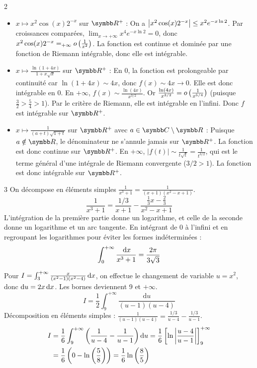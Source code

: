 \begin{correction}{2}
\begin{itemize}
    \item $x \mapsto x^2 \cos(x) 2^{-x}$ sur $\R^{+}$ :
    On a $\left|x^2 \cos(x) 2^{-x}\right| \le x^2 e^{-x \ln 2}$. Par croissances comparées, $\lim_{x\to +\infty} x^4 e^{-x \ln 2} = 0$, donc $x^2 \cos(x) 2^{-x} =_{+\infty} o\left(\frac{1}{x^2}\right)$. La fonction est continue et dominée par une fonction de Riemann intégrable, donc elle est intégrable.
    
    \item $x \mapsto \frac{\ln(1+4x)}{1+x\sqrt{x}}$ sur $\R^{+}$ :
    En $0$, la fonction est prolongeable par continuité car $\ln(1+4x) \sim 4x$, donc $f(x) \sim 4x \to 0$. Elle est donc intégrable en 0.
    En $+\infty$, $f(x) \sim \frac{\ln(4x)}{x^{3/2}}$. Or $\frac{\ln(4x)}{x^{3/2}} = o\left(\frac{1}{x^{5/4}}\right)$ (puisque $\frac{3}{2} > \frac{5}{4} > 1$). Par le critère de Riemann, elle est intégrable en l'infini. Donc $f$ est intégrable sur $\R^+$.
    
    \item $x \mapsto \frac{1}{(a+t)\sqrt{1+t}}$ sur $\R^{+}$ avec $a\in\C\setminus\R$ :
    Puisque $a \notin \R$, le dénominateur ne s'annule jamais sur $\R^+$. La fonction est donc continue sur $\R^+$. En $+\infty$, $|f(t)| \sim \frac{1}{t \sqrt{t}} = \frac{1}{t^{3/2}}$, qui est le terme général d'une intégrale de Riemann convergente ($3/2 > 1$). La fonction est donc intégrable sur $\R^+$.
\end{itemize}
\end{correction}

\begin{correction}{3}
On décompose en éléments simples $\frac{1}{x^3+1} = \frac{1}{(x+1)(x^2-x+1)}$.
$$ \frac{1}{x^3+1} = \frac{1/3}{x+1} - \frac{\frac{1}{3}x - \frac{2}{3}}{x^2-x+1} $$
L'intégration de la première partie donne un logarithme, et celle de la seconde donne un logarithme et un arc tangente. En intégrant de 0 à l'infini et en regroupant les logarithmes pour éviter les formes indéterminées :
$$ \int_0^{+\infty} \frac{\,\mathrm{d}x}{x^3+1} = \frac{2\pi}{3\sqrt{3}} $$

Pour $I = \int_{3}^{+ \infty}\frac{x}{(x^{2}-1)(x^{2}-4)}\,\mathrm{d}x$, on effectue le changement de variable $u = x^2$, donc $\mathrm{d}u = 2x\,\mathrm{d}x$. Les bornes deviennent 9 et $+\infty$.
$$ I = \frac{1}{2} \int_{9}^{+\infty} \frac{\mathrm{d}u}{(u-1)(u-4)} $$
Décomposition en éléments simples : $\frac{1}{(u-1)(u-4)} = \frac{1/3}{u-4} - \frac{1/3}{u-1}$.
\begin{align*}
I &= \frac{1}{6} \int_{9}^{+\infty} \left(\frac{1}{u-4} - \frac{1}{u-1}\right) \mathrm{d}u = \frac{1}{6} \left[ \ln\left|\frac{u-4}{u-1}\right| \right]_{9}^{+\infty} \\
  &= \frac{1}{6} \left( 0 - \ln\left(\frac{5}{8}\right) \right) = \frac{1}{6} \ln\left(\frac{8}{5}\right)
\end{align*}
\end{correction}

